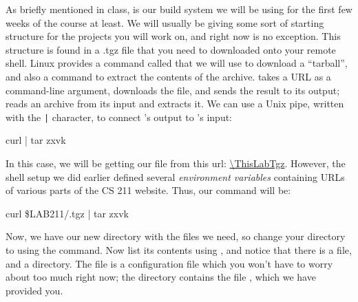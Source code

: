 \documentclass{tufte-handout}
\begin{document}
As briefly mentioned in class,  is our build system we
will be using for the first few weeks of the course at least.  We will
usually be giving some sort of starting structure for the projects you
will work on, and right now is no exception.  This structure is found in
a .tgz  file that you need to
downloaded onto your remote shell. Linux provides a command called
 that we will use to download a
``tarball'', and
also a command  to extract the contents of the archive.
 takes a URL as a command-line argument, downloads the
file, and sends the result to its output;  reads an
archive from its input and extracts it. We can use a Unix pipe, written
with the \verb!|! character, to connect ’s output to
’s input:

\begin{CmdLine}
  \prompt curl  | tar zxvk
\end{CmdLine}


\noindent In this case, we will be getting our file from this url:
\url{\ThisLabTgz}. However, the shell setup we did earlier defined
several \emph{environment variables} containing URLs of various parts of
the CS 211 website. Thus, our command will be:

\begin{CmdLine}
  \prompt curl \$LAB211/\ThisLabBase.tgz | tar zxvk
\end{CmdLine}

Now, we have our new directory with the files we need, so change your
directory to \filename{\ThisLabBase} using the  command.
Now list its contents using , and notice that there is a
 file, and a  directory. The
 file is a  configuration file which
you won't have to worry about too much right now; the 
directory contains the file , which we have provided
you.
\end{document}
